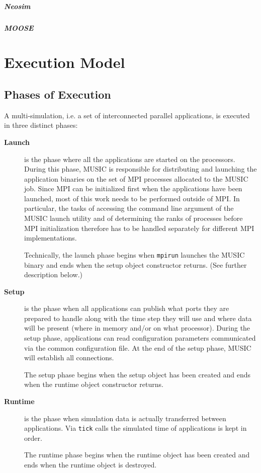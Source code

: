\documentclass[a4paper]{report}
\begin{document}
\begin{metatext}
\paragraph{Neosim}

\paragraph{MOOSE}
\end{metatext}

\chapter{Execution Model}

\section{Phases of Execution}

A multi-simulation, i.e. a set of interconnected parallel
applications, is executed in three distinct phases:
\begin{description}
\item[\textbf{Launch}] is the phase where all the
  applications are started on the processors.  During this phase,
  MUSIC is responsible for distributing and launching the application
  binaries on the set of MPI processes allocated to the MUSIC job.
  Since MPI can be initialized first when the applications have been
  launched, most of this work needs to be performed outside of MPI.
  In particular, the tasks of accessing the command line argument of
  the MUSIC launch utility and of determining the ranks of processes
  before MPI initialization therefore has to be handled separately for
  different MPI implementations.

  Technically, the launch phase begins when \texttt{mpirun} launches
  the MUSIC binary and ends when the setup object constructor
  returns.  (See further description below.)

\item[\textbf{Setup}] is the phase when all
  applications can publish what ports they are prepared to handle
  along with the time step they will use and where data will be
  present (where in memory and/or on what processor).  During the
  setup phase, applications can read configuration parameters
  communicated via the common configuration file.  At the end of the
  setup phase, MUSIC will establish all connections.

  The setup phase begins when the setup object has been created and
  ends when the runtime object constructor returns.

\item[\textbf{Runtime}] is the phase when
  simulation data is actually transferred between applications.  Via
  \texttt{tick} calls the simulated time of applications is
  kept in order.

  The runtime phase begins when the runtime object has been created
  and ends when the runtime object is destroyed.
\end{description}
\end{document}
